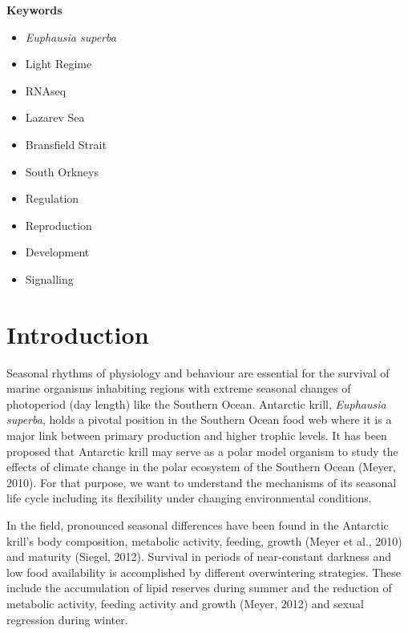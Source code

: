 \textbf{Keywords}
\begin{itemize}
    \item \textit{Euphausia superba}
    \item Light Regime
    \item RNAseq
    \item Lazarev Sea
    \item Bransfield Strait
    \item South Orkneys
    \item Regulation
    \item Reproduction
    \item Development
    \item Signalling
\end{itemize}

\section{Introduction}

Seasonal rhythms of physiology and behaviour are essential for the survival of
marine organisms inhabiting regions with extreme seasonal changes of
photoperiod (day length) like the Southern Ocean. Antarctic krill,
\textit{Euphausia superba}, holds a pivotal position in the Southern Ocean food
web where it is a major link between primary production and higher trophic
levels. It has been proposed that Antarctic krill may serve as a polar model
organism to study the effects of climate change in the polar ecosystem of the
Southern Ocean (Meyer, 2010). For that purpose, we want to understand the
mechanisms of its seasonal life cycle including its flexibility under changing
environmental conditions.

In the field, pronounced seasonal differences have been found in the Antarctic
krill's body composition, metabolic activity, feeding, growth (Meyer et al.,
2010) and maturity (Siegel, 2012). Survival in periods of near-constant
darkness and low food availability is accomplished by different overwintering
strategies. These include the accumulation of lipid reserves during summer and
the reduction of metabolic activity, feeding activity and growth (Meyer, 2012)
and sexual regression during winter.

